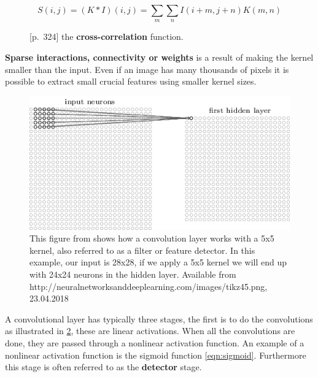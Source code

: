 \begin{figure}[H]
    \begin{equation}
        S(i,j) = (K*I)(i,j) = \sum_{m} \sum_{n} I(i+m,j+n)K(m,n)
    \end{equation}
    \label{fig:cross_corr}
    \caption{\cite{goodfellow_deep_2016}[p.~324] the \textbf{cross-correlation} function.}
\end{figure}
\textbf{Sparse interactions, connectivity or weights} is a result of making the kernel smaller than the input. Even if an image has many thousands of pixels it is possible to extract small crucial features using smaller kernel sizes.
\begin{figure}[H]
    \centering
    \includegraphics[width=\textwidth]{Assets/Chapter2_Theory/kernel_applied.png}
    \caption{This figure from \cite{nielsen_neural_2015} shows how a convolution layer works with a 5x5 kernel, also referred to as a filter or feature detector. In this example, our input is 28x28, if we apply a 5x5 kernel we will end up with 24x24 neurons in the hidden layer. Available from http://neuralnetworksanddeeplearning.com/images/tikz45.png, 23.04.2018}
    \label{fig:kernel_applied}
\end{figure}
A convolutional layer has typically three stages, the first is to do the convolutions as illustrated in \ref{fig:kernel_applied}, these are linear activations. When all the convolutions are done, they are passed through a nonlinear activation function. An example of a \gls{nonlinear} activation function is the sigmoid function \ref{eqn:sigmoid}. Furthermore this stage is often referred to as the \textbf{detector} stage.


